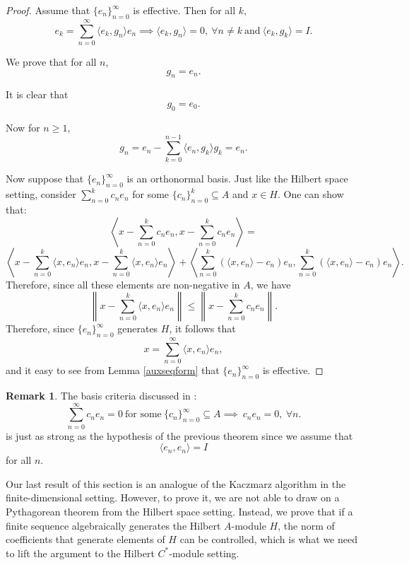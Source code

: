 \documentclass[11pt]{amsart}
\theoremstyle{definition}
\newtheorem{rem}[thm]{Remark}
\numberwithin{equation}{section}
\begin{document}
\begin{proof}
Assume that $\{e_{n}\}_{n=0}^{\infty}$ is effective.
Then for all $k$, 
$$e_{k}=\sum_{n=0}^{\infty}\langle e_{k}, g_{n}\rangle e_{n}\implies \langle e_{k},g_{n}\rangle=0, \ \forall n\neq k \ \text{and} \ \langle e_{k},g_{k}\rangle=I.$$

We prove that for all $n$, $$g_{n}=e_{n}.$$

It is clear that $$g_{0}=e_{0}.$$

Now for $n\geq 1$, $$g_{n}=e_{n}-\sum_{k=0}^{n-1}\langle e_{n},g_{k}\rangle g_{k}=e_{n}.$$

Now suppose that $\{e_{n}\}_{n=0}^{\infty}$ is an orthonormal basis. Just like the Hilbert space setting, consider $\sum_{n=0}^{k}c_{n}e_{n}$ for some $\{c_{n}\}_{n=0}^{k}\subseteq A$ and $x\in H$.
One can show that:
$$\left \langle x-\sum_{n=0}^{k}c_{n}e_{n}, x-\sum_{n=0}^{k}c_{n}e_{n} \right\rangle=$$
$$\left\langle x-\sum_{n=0}^{k}\langle x,e_{n} \rangle e_{n}, x-\sum_{n=0}^{k}\langle x, e_{n}\rangle e_{n} \right\rangle+\left\langle \sum_{n=0}^{k}(\langle x,e_{n}\rangle -c_{n})e_{n},\sum_{n=0}^{k}(\langle x,e_{n}\rangle -c_{n})e_{n} \right\rangle .$$
Therefore, since all these elements are non-negative in $A$, we have
$$\left\|x-\sum_{n=0}^{k}\langle x,e_{n} \rangle e_{n} \right\|\leq \left\|x-\sum_{n=0}^{k}c_{n}e_{n} \right\|.$$
Therefore, since $\{e_{n}\}_{n=0}^{\infty}$ generates $H$, it follows that
$$x=\sum_{n=0}^{\infty}\langle x,e_{n}\rangle e_{n},$$ and it easy to see from Lemma \ref{auxseqform} that $\{e_{n}\}_{n=0}^{\infty}$ is effective.
\end{proof}
\begin{rem}
The basis criteria discussed in \cite{Frank2002Frames}: $$\sum_{n=0}^{\infty}c_{n}e_{n}=0 \ \text{for some} \ \{c_{n}\}_{n=0}^{\infty}\subseteq A\implies \ c_{n}e_{n}=0, \ \forall n.$$ is just as strong as the hypothesis of the previous theorem since we assume that $$\langle e_{n},e_{n}\rangle=I$$ for all $n$.

\end{rem}

Our last result of this section is an analogue of the Kaczmarz algorithm in the finite-dimensional setting. However, to prove it, we are not able to draw on a Pythagorean theorem from the Hilbert space setting. Instead, we prove that if a finite sequence algebraically generates the Hilbert $A$-module $H$, the norm of coefficients that generate elements of $H$ can be controlled, which is what we need to lift the argument to the Hilbert $C^{*}$-module setting.
\end{document}
